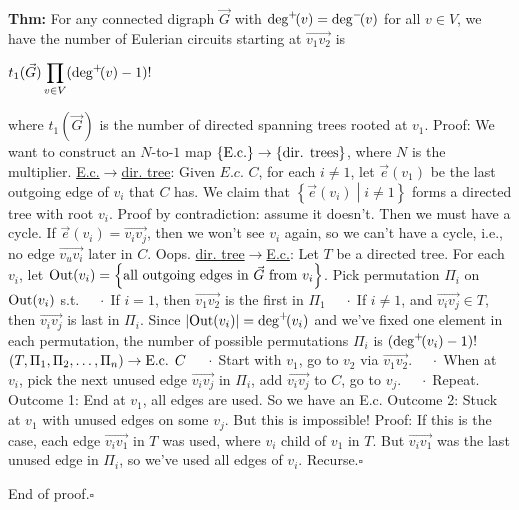 \documentclass[10pt,letterpaper]{article}
\newcommand{\n}{\hfill\break}
\newcommand{\thm}[1]{\par\noindent\settowidth{\hangindent}{\textbf{Thm: }}\textbf{Thm: }#1\n}
\newcommand{\proven}{\;$\square$\n}
\newcommand{\ptxt}[1]{\textrm{\textnormal{#1}}}
\newcommand{\inlineeq}[1]{\n\centerline{$\displaystyle #1$}}
\newcommand{\set}[1]{\left\{#1\right\}}
\newcommand{\degp}[1]{\ptxt{deg}^{+}\!\!\left(#1\right)}
\newcommand{\degn}[1]{\ptxt{deg}^{-}\!\!\left(#1\right)}
\newcommand{\abs}[1]{\left|#1\right|}
\newcommand{\st}{s.t.}
\begin{document}
\thm{For any connected digraph $\vec{G}$ with $\degp{v}=\degn{v}$ for all $v\in{}V$, we have the number of Eulerian circuits starting at $\vec{v_{1}v_{2}}$ is\n
\inlineeq{t_{1}(\vec{G})\prod_{v\in{}V}(\degp{v}-1)!}\n
where $t_{1}(\vec{G})$ is the number of directed spanning trees rooted at $v_{1}$.\n
\n
Proof: We want to construct an $N$-to-$1$ map $\set{\ptxt{E.c.}}\to\set{\ptxt{dir. trees}}$, where $N$ is the multiplier.\n
\underline{E.c.$\to$dir. tree}: Given $E.c.$ $C$, for each $i\ne{}1$, let $\vec{e}(v_{1})$ be the last outgoing edge of $v_{i}$ that $C$ has. We claim that $\set{\vec{e}(v_{i})\middle|i\ne{}1}$ forms a directed tree with root $v_{i}$. Proof by contradiction: assume it doesn't. Then we must have a cycle. If $\vec{e}(v_{i})=\vec{v_{i}v_{j}}$, then we won't see $v_{i}$ again, so we can't have a cycle, i.e., no edge $\vec{v_{u}v_{i}}$ later in $C$. Oops.\n
\n
\underline{dir. tree$\to$E.c.}: Let $T$ be a directed tree. For each $v_{i}$, let $\ptxt{Out}(v_{i})=\set{\ptxt{all outgoing edges in }\vec{G}\ptxt{ from }v_{i}}$. Pick permutation $\Pi_{i}$ on $\ptxt{Out}(v_{i})$ \st{}\n
${}\quad\cdot\;$If $i=1$, then $\vec{v_{1}v_{2}}$ is the first in $\Pi_{1}$\n
${}\quad\cdot\;$If $i\ne{}1$, and $\vec{v_{i}v_{j}}\in{}T$, then $\vec{v_{i}v_{j}}$ is last in $\Pi_{i}$.\n
Since $\abs{\ptxt{Out}(v_{i})}=\degp{v_{i}}$ and we've fixed one element in each permutation, the number of possible permutations $\Pi_{i}$ is $(\degp{v_{i}}-1)!$\n
\n
$(T,\Pi_{1},\Pi_{2},\ldots,\Pi_{n})\to\ptxt{E.c. }C$\n
${}\quad\cdot\;$Start with $v_{1}$, go to $v_{2}$ via $\vec{v_{1}v_{2}}$.\n
${}\quad\cdot\;$When at $v_{i}$, pick the next unused edge $\vec{v_{i}v_{j}}$ in $\Pi_{i}$, add $\vec{v_{i}v_{j}}$ to $C$, go to $v_{j}$.\n
${}\quad\cdot\;$Repeat.\n
Outcome 1: End at $v_{1}$, all edges are used. So we have an E.c.\n
Outcome 2: Stuck at $v_{1}$ with unused edges on some $v_{j}$. But this is impossible! Proof:\n
If this is the case, each edge $\vec{v_{i}v_{1}}$ in $T$ was used, where $v_{i}$ child of $v_{1}$ in $T$. But $\vec{v_{i}v_{1}}$ was the last unused edge in $\Pi_{i}$, so we've used all edges of $v_{i}$. Recurse.\proven}

\par\noindent End of proof.\proven
\end{document}
